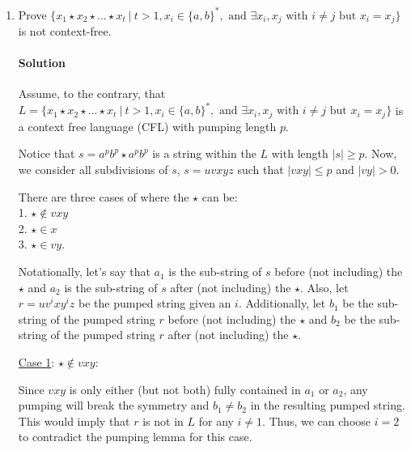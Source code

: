 \documentclass[11pt]{article}
\newcommand{\solution}[1]{\paragraph{Solution}  }
\begin{document}
\begin{enumerate}
\begin{figure}[ht]
    \end{figure}

    \newpage
    
    \item Prove $\{x_1\star x_2\star...\star x_t ~|~ t > 1, x_i \in \{a,b\}^*, \text{ and } \exists x_i,x_j \text{ with } i \neq j \text{ but } x_i = x_j \}$ is not context-free.

    \solution{4} Assume, to the contrary, that $L = \{x_1\star x_2\star...\star x_t ~|~ t > 1, x_i \in \{a,b\}^*, \text{ and } \exists x_i,x_j \text{ with } i \neq j \text{ but } x_i = x_j \} $ is a context free language (CFL) with pumping length $p$.

    Notice that $s = a^pb^p\star a^pb^p$ is a string within the $L$ with length $|s| \geq p$. Now, we consider all subdivisions of $s$, $s=uvxyz$ such that $|vxy|\leq p$ and $|vy| > 0$.

    There are three cases of where the $\star$ can be: \\
        1. $\star \notin vxy$ \\
        2. $\star \in x$ \\
        3. $\star \in vy$. 

    Notationally, let's say that $a_1$ is the sub-string of $s$ before (not including) the $\star$ and $a_2$ is the sub-string of $s$ after (not including) the $\star$. Also, let $r = uv^ixy^iz$ be the pumped string given an $i$. Additionally, let $b_1$ be the sub-string of the pumped string $r$ before (not including) the $\star$ and $b_2$ be the sub-string of the pumped string $r$ after (not including) the $\star$.

    \underline{Case 1}: $\star \notin vxy$:

    Since $vxy$ is only either (but not both) fully contained in $a_1$ or $a_2$, any pumping will break the symmetry and $b_1 \neq b_2$ in the resulting pumped string. This would imply that $r$ is not in $L$ for any $i \neq 1$. Thus, we can choose $i=2$ to contradict the pumping lemma for this case.


\end{enumerate}
\end{document}
